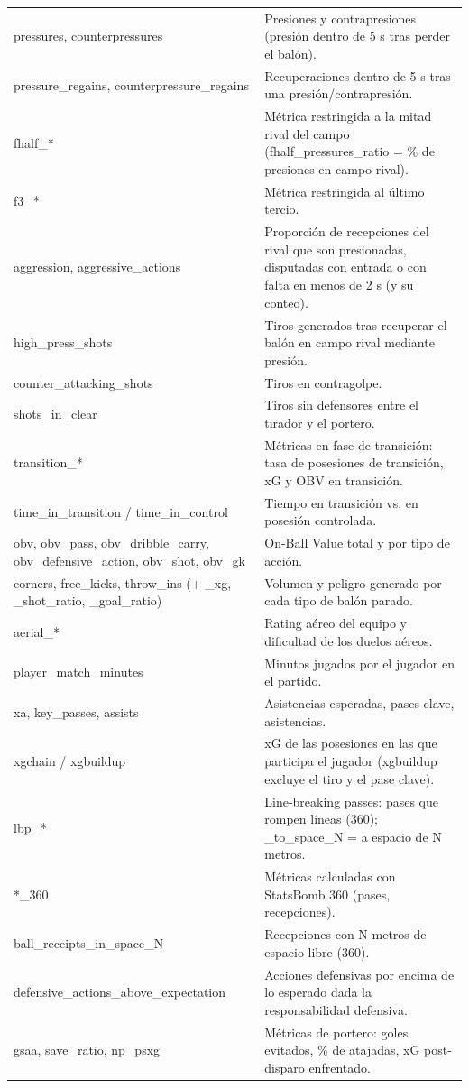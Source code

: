 {\begin{longtable}{p{4.3cm}p{11.2cm}}
pressures, counterpressures & Presiones y contrapresiones (presión dentro de 5 s tras perder el balón). \\
pressure\_regains, counterpressure\_regains & Recuperaciones dentro de 5 s tras una presión/contrapresión. \\
fhalf\_* & Métrica restringida a la mitad rival del campo (fhalf\_pressures\_ratio = \% de presiones en campo rival). \\
f3\_* & Métrica restringida al último tercio. \\
aggression, aggressive\_actions & Proporción de recepciones del rival que son presionadas, disputadas con entrada o con falta en menos de 2 s (y su conteo). \\
high\_press\_shots & Tiros generados tras recuperar el balón en campo rival mediante presión. \\
counter\_attacking\_shots & Tiros en contragolpe. \\
shots\_in\_clear & Tiros sin defensores entre el tirador y el portero. \\
transition\_* & Métricas en fase de transición: tasa de posesiones de transición, xG y OBV en transición. \\
time\_in\_transition / time\_in\_control & Tiempo en transición vs. en posesión controlada. \\
obv, obv\_pass, obv\_dribble\_carry, obv\_defensive\_action, obv\_shot, obv\_gk & On-Ball Value total y por tipo de acción. \\
corners, free\_kicks, throw\_ins (+ \_xg, \_shot\_ratio, \_goal\_ratio) & Volumen y peligro generado por cada tipo de balón parado. \\
aerial\_* & Rating aéreo del equipo y dificultad de los duelos aéreos. \\
player\_match\_minutes & Minutos jugados por el jugador en el partido. \\
xa, key\_passes, assists & Asistencias esperadas, pases clave, asistencias. \\
xgchain / xgbuildup & xG de las posesiones en las que participa el jugador (xgbuildup excluye el tiro y el pase clave). \\
lbp\_* & Line-breaking passes: pases que rompen líneas (360); \_to\_space\_N = a espacio de N metros. \\
*\_360 & Métricas calculadas con StatsBomb 360 (pases, recepciones). \\
ball\_receipts\_in\_space\_N & Recepciones con N metros de espacio libre (360). \\
defensive\_actions\_above\_expectation & Acciones defensivas por encima de lo esperado dada la responsabilidad defensiva. \\
gsaa, save\_ratio, np\_psxg & Métricas de portero: goles evitados, \% de atajadas, xG post-disparo enfrentado. \\
\end{longtable}
}